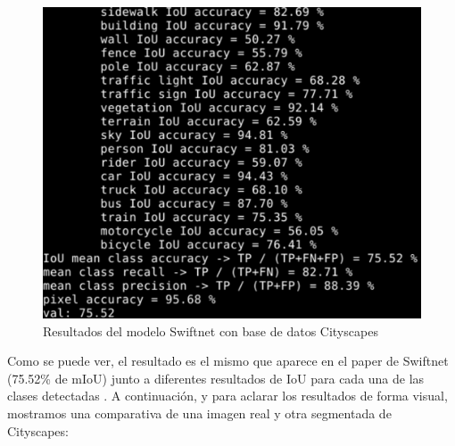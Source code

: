 \begin{figure}[H]
\centering
\includegraphics[width=12cm]{Figuras/Res_Swiftnet_Cityscapes.eps}
\caption{Resultados del modelo Swiftnet con base de datos Cityscapes}
\label{fig:Res_Swift}
\end{figure}

Como se puede ver, el resultado es el mismo que aparece en el paper de Swiftnet (75.52\% de \ac{mIoU}) junto a diferentes resultados de \ac{IoU} para cada una de las clases detectadas \cite{swiftnet}. A continuación, y para aclarar los resultados de forma visual, mostramos una comparativa de una imagen real y otra segmentada de Cityscapes:

